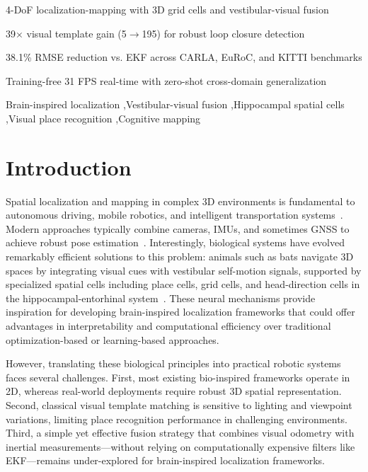 \documentclass[preprint,12pt]{elsarticle}
\begin{document}
\begin{frontmatter}
\begin{highlights}
\item 4-DoF localization-mapping with 3D grid cells and vestibular-visual fusion
\item 39$\times$ visual template gain (5$\rightarrow$195) for robust loop closure detection
\item 38.1\% RMSE reduction vs. EKF across CARLA, EuRoC, and KITTI benchmarks
\item Training-free 31 FPS real-time with zero-shot cross-domain generalization
\end{highlights}

\begin{keyword}
Brain-inspired localization \sep Vestibular-visual fusion \sep Hippocampal spatial cells \sep Visual place recognition \sep Cognitive mapping
\end{keyword}

\end{frontmatter}

\section{Introduction}
\label{sec:intro}

Spatial localization and mapping in complex 3D environments is fundamental to autonomous driving, mobile robotics, and intelligent transportation systems~\cite{cadena2016past}. Modern approaches typically combine cameras, IMUs, and sometimes GNSS to achieve robust pose estimation~\cite{saputra2018visual}. Interestingly, biological systems have evolved remarkably efficient solutions to this problem: animals such as bats navigate 3D spaces by integrating visual cues with vestibular self-motion signals, supported by specialized spatial cells including place cells, grid cells, and head-direction cells in the hippocampal-entorhinal system~\cite{jeffery2013navigating,hafting2005microstructure,taube1990head,finkelstein2016three,solstad2008representation}. These neural mechanisms provide inspiration for developing brain-inspired localization frameworks that could offer advantages in interpretability and computational efficiency over traditional optimization-based or learning-based approaches.

However, translating these biological principles into practical robotic systems faces several challenges. First, most existing bio-inspired frameworks operate in 2D, whereas real-world deployments require robust 3D spatial representation. Second, classical visual template matching is sensitive to lighting and viewpoint variations, limiting place recognition performance in challenging environments. Third, a simple yet effective fusion strategy that combines visual odometry with inertial measurements---without relying on computationally expensive filters like EKF---remains under-explored for brain-inspired localization frameworks.
\end{document}
